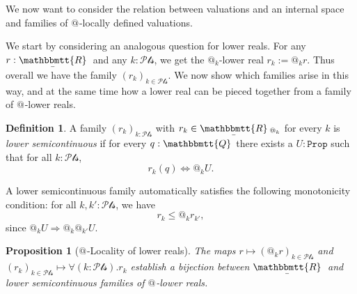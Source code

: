 \documentclass[11pt, oneside, article]{memoir}
\makeatletter
\theoremstyle{plain}
\newtheorem{proposition}[theorem]{Proposition}
\theoremstyle{definition}
\newtheorem{definition}[theorem]{Definition}
\theoremstyle{remark}
\newcommand{\const}[1]{\mathtt{#1}}
\newcommand{\ubar}[1]{\underaccent{\bar}{#1}}
\newcommand{\internal}[1]{\raisebox{-.03ex}{$\mathbbmtt{#1}$}}
\newcommand{\hs}{\hspace{1.1pt}}
\newcommand{\tqq}{\internal{Q}\hs}
\newcommand{\trr}{\internal{R}\hs}
\newcommand{\tlrr}{\ubar{\trr}\hs}
\newcommand{\prop}{\const{Prop}}
\newcommand{\pt}{k}				%
\newcommand{\Pts}{\mathcal{Pts}}		%
\newcommand{\AtSymbol}{{@}}
\newcommand{\At}[1][\pt]{\AtSymbol_{#1}}
\newcommand{\imp}{\Rightarrow}
\makeatother
\begin{document}
We now want to consider the relation between valuations and an internal space and families of $\At[]$-locally defined valuations.

We start by considering an analogous question for lower reals. For any $r : \tlrr$ and any $\pt : \Pts$, we get the $\At$-lower real $r_\pt := \At r$. Thus overall we have the family $(r_\pt)_{\pt \in \Pts}$. We now show which families arise in this way, and at the same time how a lower real can be pieced together from a family of $\At[]$-lower reals.

\begin{definition}
	A family $(r_\pt)_{\pt : \Pts}$ with $r_\pt \in \tlrr_{\At}$ for every $\pt$ is \emph{lower semicontinuous} if for every $q:\tqq$ there exists a $U:\prop$ such that for all $\pt : \Pts$,
	\begin{equation}\label{eqn.witness}
		r_\pt(q) \Leftrightarrow \At U.
	\end{equation}
\end{definition}

A lower semicontinuous family automatically satisfies the following monotonicity condition: for all $\pt,\pt' : \Pts$, we have
\begin{equation}
	\label{r_pt_monotone}
	r_\pt \le \At r_{\pt'},
\end{equation}
since $\At U \imp \At \At[\pt'] U$.

\begin{proposition}[{$\At[]$-Locality of lower reals}]
	\label{prop:LR_locality}
	The maps $r \mapsto (\At r)_{\pt\in\Pts}$ and $(r_\pt)_{\pt\in\Pts}\mapsto \forall(\pt:\Pts).r_k$ establish a bijection between $\tlrr$ and lower semicontinuous families of $\At[]$-lower reals.
\end{proposition}
\end{document}
